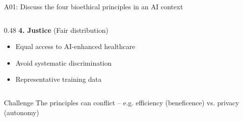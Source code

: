 \documentclass[aspectratio=169, 10pt]{beamer}
\begin{document}
\begin{frame}{A01: Discuss the four bioethical principles in an AI context}
\begin{columns}[T]
\begin{column}{0.48\textwidth}
            \vspace{0.3cm}
            \textbf{4. Justice} (Fair distribution)
            \begin{itemize}
                \item Equal access to AI-enhanced healthcare
                \item Avoid systematic discrimination
                \item Representative training data
            \end{itemize}
        \end{column}
    \end{columns}
    
    \vspace{0.3cm}
    \begin{block}{Challenge}
        The principles can conflict -- e.g. efficiency (beneficence) vs. privacy (autonomy)
    \end{block}
\end{frame}
\end{document}
